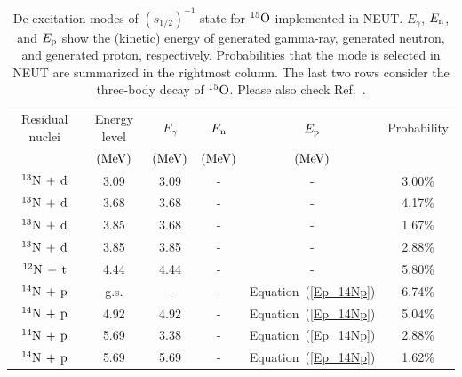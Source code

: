 \begin{table}[h]
	\centering
	\caption[De-excitation modes of $(s_{1/2})^{-1}$ state for $^{15}{\rm O}$ implemented in NEUT]{
	De-excitation modes of $(s_{1/2})^{-1}$ state for $^{15}{\rm O}$ implemented in NEUT.
	$E_{\gamma}$, $E_{{\rm n}}$, and $E_{{\rm p}}$ show the (kinetic) energy of generated gamma-ray, generated neutron, and generated proton, respectively.
	Probabilities that the mode is selected in NEUT are summarized in the rightmost column.
	The last two rows consider the three-body decay of $^{15}{\rm O}$.
	Please also check Ref.~\cite{2006Kobayashi}.
	}\label{deex_s1_2_O}
	\vs
	\begin{tabular}{cccccc} \hline \hline
		Residual nuclei            & Energy level  & $E_{\gamma}$  & $E_{{\rm n}}$            & $E_{{\rm p}}$            & Probability \\
		                           & $({\rm MeV})$ & $({\rm MeV})$ & $({\rm MeV})$            & $({\rm MeV})$            &             \\ \hline
		$^{13}{\rm N}\,+\,{\rm d}$ & 3.09          & 3.09          & -                        & -                        & 3.00\%      \\
		$^{13}{\rm N}\,+\,{\rm d}$ & 3.68          & 3.68          & -                        & -                        & 4.17\%      \\
		$^{13}{\rm N}\,+\,{\rm d}$ & 3.85          & 3.68          & -                        & -                        & 1.67\%      \\
		$^{13}{\rm N}\,+\,{\rm d}$ & 3.85          & 3.85          & -                        & -                        & 2.88\%      \\
		$^{12}{\rm N}\,+\,{\rm t}$ & 4.44          & 4.44          & -                        & -                        & 5.80\%      \\
		$^{14}{\rm N}\,+\,{\rm p}$ & g.s.          & -             & -                        & Equation~(\ref{Ep_14Np}) & 6.74\%      \\
		$^{14}{\rm N}\,+\,{\rm p}$ & 4.92          & 4.92          & -                        & Equation~(\ref{Ep_14Np}) & 5.04\%      \\
		$^{14}{\rm N}\,+\,{\rm p}$ & 5.69          & 3.38          & -                        & Equation~(\ref{Ep_14Np}) & 2.88\%      \\
		$^{14}{\rm N}\,+\,{\rm p}$ & 5.69          & 5.69          & -                        & Equation~(\ref{Ep_14Np}) & 1.62\%      \\

\end{tabular}
\end{table}
